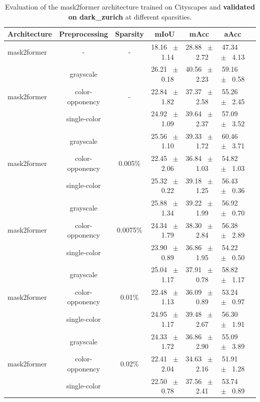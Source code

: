 \begin{table}[h]
  \centering
  \caption{Evaluation of the mask2former architecture trained on Cityscapes and \textbf{validated on dark_zurich} at different sparsities.}
  \begin{tabular}{@{}lccc ccc@{}}
    \toprule
    Architecture & Preprocessing & Sparsity & mIoU & mAcc & aAcc \\
    \midrule
    mask2former & - & - & 18.16 ~$\pm$~ 1.14 & 28.88 ~$\pm$~ 2.72 & 47.34 ~$\pm$~ 4.13 \\
    \midrule
    \midrule
    \multirow{3}{*}{mask2former} & grayscale & \multirow{3}{*}{-} & 26.21 ~$\pm$~ 0.18 & 40.56 ~$\pm$~ 2.23 & 59.16 ~$\pm$~ 0.58 \\
    & color-opponency & & 22.84 ~$\pm$~ 1.82 & 37.37 ~$\pm$~ 2.58 & 55.26 ~$\pm$~ 2.45 \\
    & single-color & & 24.92 ~$\pm$~ 1.09 & 39.64 ~$\pm$~ 2.37 & 57.09 ~$\pm$~ 3.52 \\
    \midrule
    \multirow{3}{*}{mask2former} & grayscale & \multirow{3}{*}{0.005\%} & 25.56 ~$\pm$~ 1.10 & 39.33 ~$\pm$~ 1.72 & 60.46 ~$\pm$~ 3.71 \\
    & color-opponency & & 22.45 ~$\pm$~ 2.06 & 36.84 ~$\pm$~ 1.03 & 54.82 ~$\pm$~ 1.03 \\
    & single-color & & 25.32 ~$\pm$~ 0.22 & 39.18 ~$\pm$~ 1.25 & 56.43 ~$\pm$~ 0.36 \\
    \midrule
    \multirow{3}{*}{mask2former} & grayscale & \multirow{3}{*}{0.0075\%} & 25.88 ~$\pm$~ 1.34 & 39.22 ~$\pm$~ 1.99 & 56.92 ~$\pm$~ 0.70 \\
    & color-opponency & & 24.34 ~$\pm$~ 1.79 & 38.30 ~$\pm$~ 2.84 & 56.38 ~$\pm$~ 2.89 \\
    & single-color & & 23.90 ~$\pm$~ 0.89 & 36.86 ~$\pm$~ 1.95 & 54.22 ~$\pm$~ 0.50 \\
    \midrule
    \multirow{3}{*}{mask2former} & grayscale & \multirow{3}{*}{0.01\%} & 25.04 ~$\pm$~ 1.17 & 37.91 ~$\pm$~ 0.78 & 58.82 ~$\pm$~ 1.17 \\
    & color-opponency & & 22.48 ~$\pm$~ 1.13 & 36.09 ~$\pm$~ 0.89 & 53.24 ~$\pm$~ 0.97 \\
    & single-color & & 24.95 ~$\pm$~ 1.17 & 39.48 ~$\pm$~ 2.67 & 56.30 ~$\pm$~ 1.91 \\
    \midrule
    \multirow{3}{*}{mask2former} & grayscale & \multirow{3}{*}{0.02\%} & 24.33 ~$\pm$~ 1.72 & 36.86 ~$\pm$~ 2.90 & 55.09 ~$\pm$~ 3.89 \\
    & color-opponency & & 22.41 ~$\pm$~ 2.04 & 34.63 ~$\pm$~ 2.16 & 51.91 ~$\pm$~ 1.28 \\
    & single-color & & 22.50 ~$\pm$~ 0.78 & 37.56 ~$\pm$~ 2.41 & 53.74 ~$\pm$~ 0.89 \\
    \midrule
    \bottomrule
  \end{tabular}
  \label{tab:sparse_mask2former_dark_zurich}
\end{table}